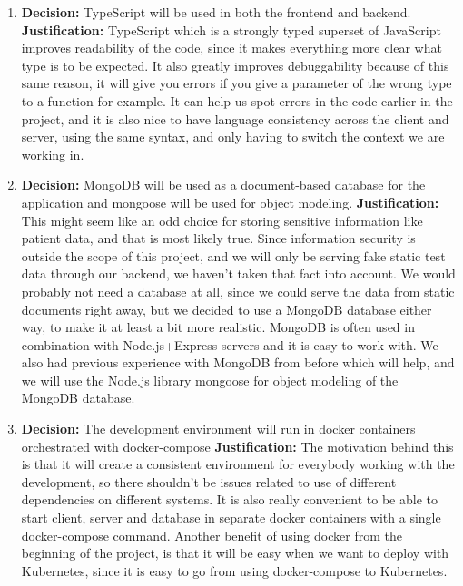 \documentclass{article}
\begin{document}
\begin{enumerate}
      \item \textbf{Decision:} TypeScript will be used in both the frontend and backend.
    \linebreak{}
    \textbf{Justification:} TypeScript which is a strongly typed superset of JavaScript improves readability of the code, since it makes everything more clear what type is to be expected. It also greatly improves debuggability because of this same reason, it will give you errors if you give a parameter of the wrong type to a function for example. It can help us spot errors in the code earlier in the project, and it is also nice to have language consistency across the client and server, using the same syntax, and only having to switch the context we are working in. 
    
     \item \textbf{Decision:} MongoDB will be used as a document-based database for the application and mongoose will be used for object modeling.
    \linebreak{}
    \textbf{Justification:} This might seem like an odd choice for storing sensitive information like patient data, and that is most likely true. Since information security is outside the scope of this project, and we will only be serving fake static test data through our backend, we haven't taken that fact into account. We would probably not need a database at all, since we could serve the data from static documents right away, but we decided to use a MongoDB database either way, to make it at least a bit more realistic. MongoDB is often used in combination with Node.js+Express servers and it is easy to work with. We also had previous experience with MongoDB from before which will help, and we will use the Node.js library mongoose for object modeling of the MongoDB database.
    
      \item \textbf{Decision:} The development environment will run in docker containers orchestrated with docker-compose
    \linebreak{}
    \textbf{Justification:} The motivation behind this is that it will create a consistent environment for everybody working with the development, so there shouldn't be issues related to use of different dependencies on different systems. It is also really convenient to be able to start client, server and database in separate docker containers with a single docker-compose command. Another benefit of using docker from the beginning of the project, is that it will be easy when we want to deploy with Kubernetes, since it is easy to go from using docker-compose to Kubernetes.
    
\end{enumerate}
\end{document}
